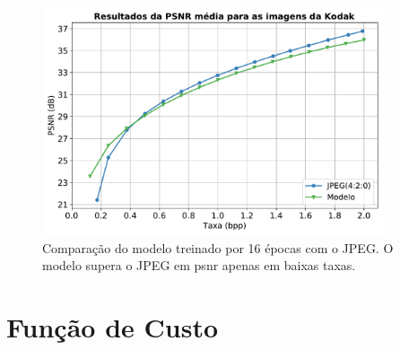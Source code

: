 \begin{figure}
	\centering
	\includegraphics[width=0.9\textwidth]{figuras/psnr_ae_jpeg.pdf}
	\caption[Curva \acrshort{psnr} por Taxa]{Comparação do modelo treinado por 16 épocas com o JPEG. O modelo supera o JPEG em \acrshort{psnr} apenas em baixas taxas.}
	\label{fig:psnr_ae_jpeg}
\end{figure}	









\section{Função de Custo}

